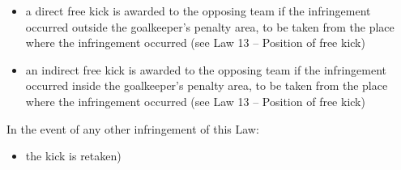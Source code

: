 {{\begin{itemize}
\item a direct free kick is awarded to the opposing team if the infringement
occurred outside the goalkeeper's penalty area, to be
taken from the place where the infringement occurred (see Law 13 --
Position of free kick)
\item an indirect free kick is awarded to the opposing team if the
infringement occurred inside the goalkeeper's penalty
area, to be taken from the place where the infringement occurred (see
Law 13 -- Position of free kick)
\end{itemize}

\bigskip

In the event of any other infringement of this Law:

\begin{itemize}
\item the kick is retaken) 
\end{itemize}
}
}
